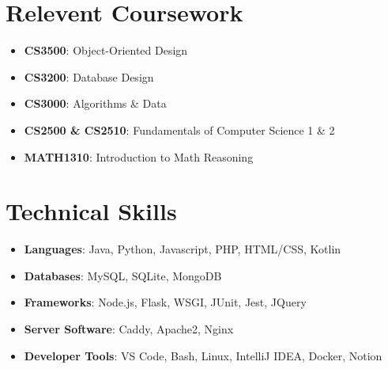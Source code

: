 \documentclass[letterpaper,11pt]{article}
\newcommand{\resumeItem}[2]{
  \item\small{
    \textbf{#1}{: #2 \vspace{-2pt}}
  }
}
\newcommand{\resumeSubItem}[2]{\resumeItem{#1}{#2}\vspace{-4pt}}
\newcommand{\resumeSubHeadingListStart}{\begin{itemize}[leftmargin=*]}
\newcommand{\resumeSubHeadingListEnd}{\end{itemize}}
\begin{document}


\section{Relevent Coursework}
  \resumeSubHeadingListStart
 \resumeSubItem{CS3500}
      {Object-Oriented Design}
\resumeSubItem{CS3200}
      {Database Design}
 \resumeSubItem{CS3000}
      {Algorithms \& Data}
\resumeSubItem{CS2500 \& CS2510}
      {Fundamentals of Computer Science 1 \& 2}
 \resumeSubItem{MATH1310}
      {Introduction to Math Reasoning}
   
  
    

   
  \resumeSubHeadingListEnd

\section{Technical Skills}
  \resumeSubHeadingListStart
    \resumeSubItem{Languages}
      {Java, Python, Javascript, PHP, HTML/CSS, Kotlin}
\resumeSubItem{Databases}
      {MySQL, SQLite, MongoDB}
\resumeSubItem{Frameworks}
      {Node.js, Flask, WSGI, JUnit, Jest, JQuery}
\resumeSubItem{Server Software}
      {Caddy, Apache2, Nginx}
    \resumeSubItem{Developer Tools}
      {VS Code, Bash, Linux, IntelliJ IDEA, Docker, Notion}
  \resumeSubHeadingListEnd
\end{document}
